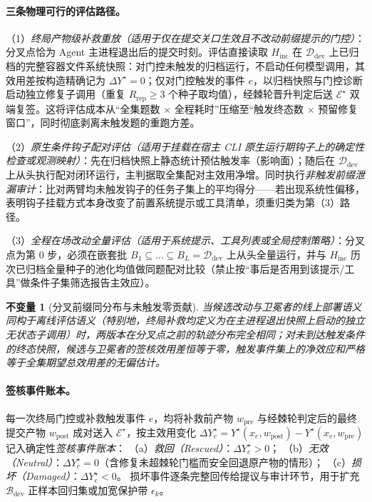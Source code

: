 \documentclass[UTF8,a4paper,10.5pt]{ctexart}
\newtheorem{inv}{不变量}
\newcommand{\Ddev}{\mathcal{D}_{\mathrm{dev}}}
\newcommand{\Bdev}{\mathcal{B}_{\mathrm{dev}}}
\begin{document}
\paragraph{三条物理可行的评估路径。}
（1）\emph{终局产物级补救重放（适用于仅在提交关口生效且不改动前缀提示的门控）}：分叉点恰为 Agent 主进程退出后的提交时刻。评估直接读取 $H_{\mathrm{inc}}$ 在 $\Ddev$ 上已归档的完整容器文件系统快照：对门控未触发的归档运行，不启动任何模型调用，其效用差按构造精确记为 $\Delta Y^\star=0$；仅对门控触发的事件 $e$，以归档快照与门控诊断启动独立修复子调用（重复 $R_{\mathrm{rep}}\ge 3$ 个种子取均值），经棘轮晋升判定后送 $\mathcal{E}^\star$ 双端复签。这将评估成本从“全集题数 $\times$ 全程耗时”压缩至“触发终态数 $\times$ 预留修复窗口”，同时彻底剥离未触发题的重跑方差。

（2）\emph{原生条件钩子配对评估（适用于挂载在宿主 CLI 原生运行期钩子上的确定性检查或观测映射）}：先在归档快照上静态统计预估触发率（影响面）；随后在 $\Ddev$ 上从头执行配对闭环运行，主判据取全集配对主效用净增。同时执行\emph{非触发前缀泄漏审计}：比对两臂均未触发钩子的任务子集上的平均得分——若出现系统性偏移，表明钩子挂载方式本身改变了前置系统提示或工具清单，须重归类为第（3）路径。

（3）\emph{全程在场改动全量评估（适用于系统提示、工具列表或全局控制策略）}：分叉点为第 $0$ 步，必须在嵌套批 $B_1\subseteq\dots\subseteq B_L=\Ddev$ 上从头全量运行，并与 $H_{\mathrm{inc}}$ 历次已归档全量种子的池化均值做同题配对比较（禁止按“事后是否用到该提示/工具”做条件子集筛选报告主效应）。

\begin{inv}[分叉前缀同分布与未触发零贡献]
\label{inv:fork}
当候选改动与卫冕者的线上部署语义同构于离线评估语义（特别地，终局补救均定义为在主进程退出快照上启动的独立无状态子调用）时，两版本在分叉点之前的轨迹分布完全相同；对未到达触发条件的终态快照，候选与卫冕者的签核效用差恒等于零，触发事件集上的净效应和严格等于全集期望总效用差的无偏估计。
\end{inv}

\paragraph{签核事件账本。}
每一次终局门控或补救触发事件 $e$，均将补救前产物 $w_{\mathrm{pre}}$ 与经棘轮判定后的最终提交产物 $w_{\mathrm{post}}$ 成对送入 $\mathcal{E}^\star$，按主效用变化 $\Delta Y^\star_e = Y^\star(x_e,w_{\mathrm{post}})-Y^\star(x_e,w_{\mathrm{pre}})$ 记入确定性\emph{签核事件账本}：
（a）\emph{救回（Rescued）}：$\Delta Y^\star_e > 0$；
（b）\emph{无效（Neutral）}：$\Delta Y^\star_e = 0$（含修复未超棘轮门槛而安全回退原产物的情形）；
（c）\emph{损坏（Damaged）}：$\Delta Y^\star_e < 0$。
损坏事件逐条完整回传给提议与审计环节，用于扩充 $\Bdev$ 正样本回归集或加宽保护带 $\epsilon_k$。
\end{document}

